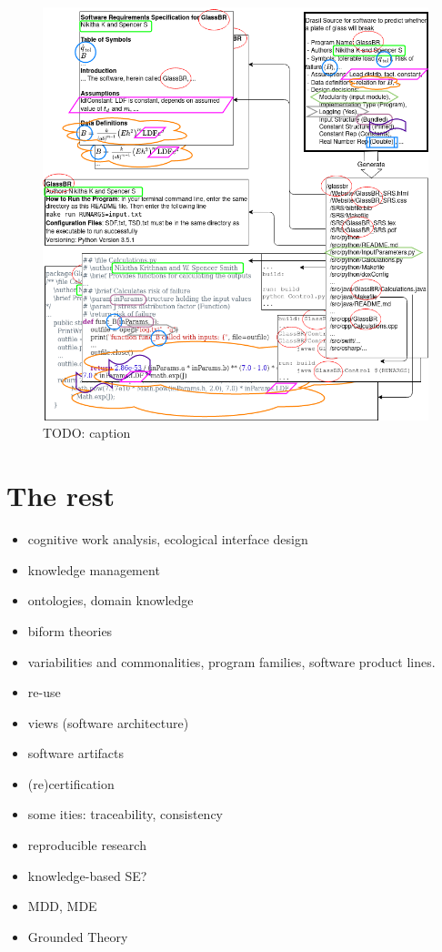 \documentclass[sigconf,review]{acmart}
\begin{document}
\begin{figure}[h]
  \centering
  \includegraphics[width=\linewidth]{assets/DrasilSupportsChange-right-portrait-overlapped-ungrouped-v1.drawio.png}
  \caption{TODO: caption}
\end{figure}

\section{The rest}
\begin{itemize}
\item cognitive work analysis, ecological interface design
\item knowledge management
\item ontologies, domain knowledge
\item biform theories
\item variabilities and commonalities, program families,
software product lines.
\item re-use
\item views (software architecture)
\item software artifacts
\item (re)certification
\item some ities: traceability, consistency
\item reproducible research
\item knowledge-based SE?
\item MDD, MDE
\item Grounded Theory
\end{itemize}
\end{document}
